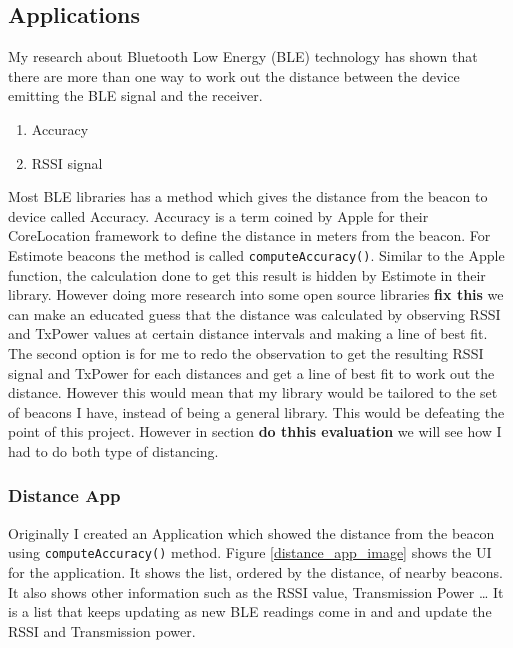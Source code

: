 \subsection{Applications}
My research about Bluetooth Low Energy (BLE) technology has shown that there are more than one way to work out the distance between the device emitting the BLE signal and the receiver. 
\begin{enumerate}
\item Accuracy
\item RSSI signal
\end{enumerate}
Most BLE libraries has a method which gives the distance from the beacon to device called Accuracy. Accuracy is a term coined by Apple for their CoreLocation framework to define the distance in meters from the beacon. For Estimote beacons the method is called  \lstinline|computeAccuracy()|. Similar to the Apple function, the calculation done to get this result is hidden by Estimote in their library. However doing more research into some open source libraries \textbf{fix this}\cite{radius-ranging} we can make an educated guess that the distance was calculated by observing RSSI and TxPower values at certain distance intervals and making a line of best fit.
The second option is for me to redo the observation to get the resulting RSSI signal and TxPower for each distances and get a line of best fit to work out the distance. However this would mean that my library would be tailored to the set of beacons I have, instead of being a general library. This would be defeating the point of this project. However in section \textbf{do thhis evaluation} we will see how I had to do both type of distancing.

\subsubsection{Distance App} \label{nocamera_distanceapp}
Originally I created an Application which showed the distance from the beacon using \lstinline|computeAccuracy()| method. Figure \ref{distance_app_image} shows the UI for the application. It shows the list, ordered by the distance, of nearby beacons. It also shows other information such as the RSSI value, Transmission Power \ldots
It is a list that keeps updating as new BLE readings come in and and update the RSSI and Transmission power.

